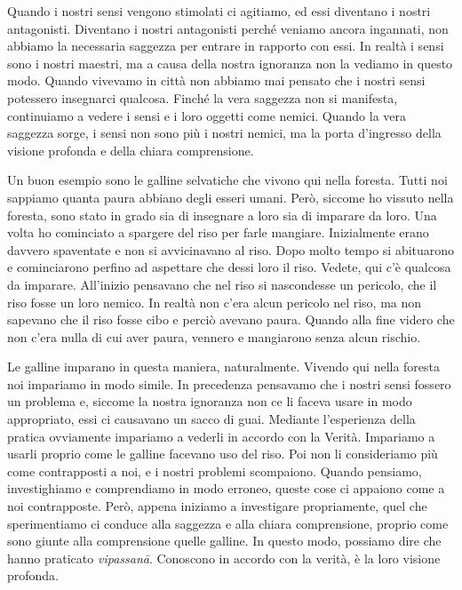 Quando i nostri sensi vengono stimolati ci agitiamo, ed essi diventano i
nostri antagonisti. Diventano i nostri antagonisti perché veniamo ancora
ingannati, non abbiamo la necessaria saggezza per entrare in rapporto
con essi. In realtà i sensi sono i nostri maestri, ma a causa della
nostra ignoranza non la vediamo in questo modo. Quando vivevamo in città
non abbiamo mai pensato che i nostri sensi potessero insegnarci
qualcosa. Finché la vera saggezza non si manifesta, continuiamo a vedere
i sensi e i loro oggetti come nemici. Quando la vera saggezza sorge, i
sensi non sono più i nostri nemici, ma la porta d'ingresso della visione
profonda e della chiara comprensione.

Un buon esempio sono le galline selvatiche che vivono qui nella foresta.
Tutti noi sappiamo quanta paura abbiano degli esseri umani. Però,
siccome ho vissuto nella foresta, sono stato in grado sia di insegnare a
loro sia di imparare da loro. Una volta ho cominciato a spargere del
riso per farle mangiare. Inizialmente erano davvero spaventate e non si
avvicinavano al riso. Dopo molto tempo si abituarono e cominciarono
perfino ad aspettare che dessi loro il riso. Vedete, qui c'è qualcosa da
imparare. All'inizio pensavano che nel riso si nascondesse un pericolo,
che il riso fosse un loro nemico. In realtà non c'era alcun pericolo nel
riso, ma non sapevano che il riso fosse cibo e perciò avevano paura.
Quando alla fine videro che non c'era nulla di cui aver paura, vennero e
mangiarono senza alcun rischio.

Le galline imparano in questa maniera, naturalmente. Vivendo qui nella
foresta noi impariamo in modo simile. In precedenza pensavamo che i
nostri sensi fossero un problema e, siccome la nostra ignoranza non ce
li faceva usare in modo appropriato, essi ci causavano un sacco di guai.
Mediante l'esperienza della pratica ovviamente impariamo a vederli in
accordo con la Verità. Impariamo a usarli proprio come le galline
facevano uso del riso. Poi non li consideriamo più come contrapposti a
noi, e i nostri problemi scompaiono. Quando pensiamo, investighiamo e
comprendiamo in modo erroneo, queste cose ci appaiono come a noi
contrapposte. Però, appena iniziamo a investigare propriamente, quel che
sperimentiamo ci conduce alla saggezza e alla chiara comprensione,
proprio come sono giunte alla comprensione quelle galline. In questo
modo, possiamo dire che hanno praticato \emph{vipassanā}. Conoscono in
accordo con la verità, è la loro visione profonda.

